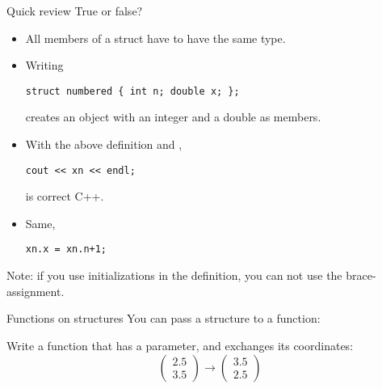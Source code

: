 \begin{exercise}{Quick review}
  \label{rev:func-def}
  True or false?
  \begin{itemize}
  \item All members of a struct have to have the same type.
  \item Writing
\begin{lstlisting}
struct numbered { int n; double x; };
\end{lstlisting}
creates an object with an integer and a double as members.
\item With the above definition and ,
\begin{lstlisting}
cout << xn << endl;
\end{lstlisting}
is correct C++.
\item Same, 
\begin{lstlisting}
xn.x = xn.n+1;
\end{lstlisting}
  \end{itemize}
\end{exercise}

Note: if you use initializations in the  definition,
you can not use the brace-assignment.

\begin{block}{Functions on structures}
  \label{sl:struct-pass}
  You can pass a structure to a function:
\end{block}


\begin{exercise}
  \label{ex:vecstruct-flip}
  Write a  function that has a  parameter,
  and exchanges its coordinates:
  \[ \begin{pmatrix}2.5\\3.5\end{pmatrix} \rightarrow
    \begin{pmatrix}3.5\\2.5\end{pmatrix} \]
\end{exercise}

